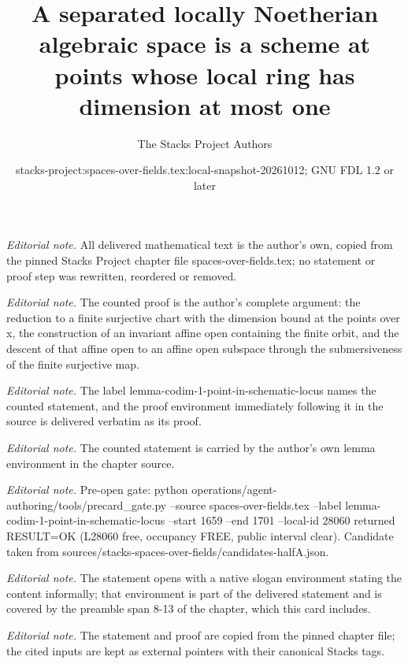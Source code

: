 \documentclass[10pt,a4paper]{amsart}
\title{A separated locally Noetherian algebraic space is a scheme at points whose local ring has dimension at most one}
\author{The Stacks Project Authors}
\date{stacks-project:spaces-over-fields.tex:local-snapshot-20261012; GNU FDL 1.2 or later}
\theoremstyle{plain}
\theoremstyle{definition}
\theoremstyle{remark}
\numberwithin{equation}{subsection}
\begin{document}
\maketitle
\noindent\textit{Editorial note.} All delivered mathematical text is the author's own, copied from the pinned Stacks Project chapter file spaces-over-fields.tex; no statement or proof step was rewritten, reordered or removed.\par\medskip
\noindent\textit{Editorial note.} The counted proof is the author's complete argument: the reduction to a finite surjective chart with the dimension bound at the points over x, the construction of an invariant affine open containing the finite orbit, and the descent of that affine open to an affine open subspace through the submersiveness of the finite surjective map.\par\medskip
\noindent\textit{Editorial note.} The label lemma-codim-1-point-in-schematic-locus names the counted statement, and the proof environment immediately following it in the source is delivered verbatim as its proof.\par\medskip
\noindent\textit{Editorial note.} The counted statement is carried by the author's own lemma environment in the chapter source.\par\medskip
\noindent\textit{Editorial note.} Pre-open gate: python operations/agent-authoring/tools/precard\_gate.py --source spaces-over-fields.tex --label lemma-codim-1-point-in-schematic-locus --start 1659 --end 1701 --local-id 28060 returned RESULT=OK (L28060 free, occupancy FREE, public interval clear). Candidate taken from sources/stacks-spaces-over-fields/candidates-halfA.json.\par\medskip
\noindent\textit{Editorial note.} The statement opens with a native slogan environment stating the content informally; that environment is part of the delivered statement and is covered by the preamble span 8-13 of the chapter, which this card includes.\par\medskip
\noindent\textit{Editorial note.} The statement and proof are copied from the pinned chapter file; the cited inputs are kept as external pointers with their canonical Stacks tags.\par\medskip
\end{document}
